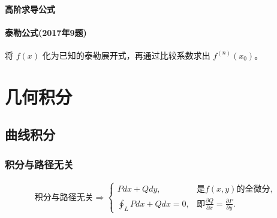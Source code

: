 \documentclass[a4paper,12pt,UTF8]{ctexart}
\begin{document}
    \paragraph{高阶求导公式}

    \paragraph{泰勒公式(2017年9题)}
    将 \(f(x)\) 化为已知的泰勒展开式，再通过比较系数求出 \(f^{(n)}(x_0)\)。

    \section{几何积分}

    \subsection{曲线积分}

    \subsubsection{积分与路径无关}
    \begin{align*}
        \text{积分与路径无关} \Rightarrow 
        \begin{cases}
            Pdx+Qdy,& \text{是} f(x, y) \text{的全微分},\\
            \oint_{L} Pdx+Qdx = 0,& \text{即} \frac{\partial Q}{\partial x} = \frac{\partial P}{\partial y}.
        \end{cases}
    \end{align*}
    
\end{document}
